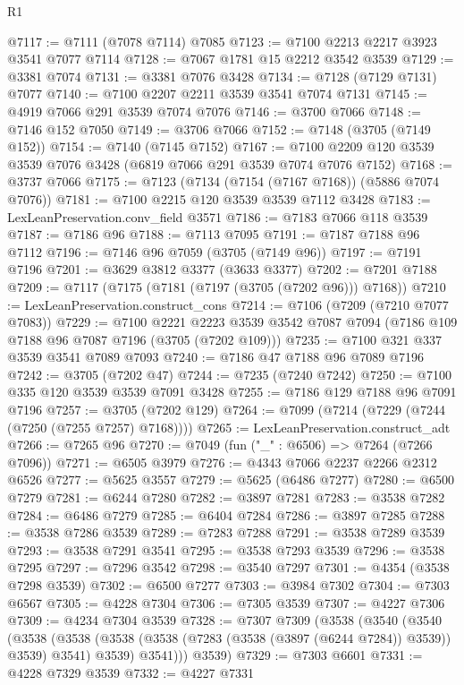 \begin{lexlean}{R1}
\begin{coremodule}
@7117 := @7111 (@7078 @7114) @7085
@7123 := @7100 @2213 @2217 @3923 @3541 @7077 @7114
@7128 := @7067 @1781 @15 @2212 @3542 @3539
@7129 := @3381 @7074
@7131 := @3381 @7076 @3428
@7134 := @7128 (@7129 @7131) @7077
@7140 := @7100 @2207 @2211 @3539 @3541 @7074 @7131
@7145 := @4919 @7066 @291 @3539 @7074 @7076
@7146 := @3700 @7066
@7148 := @7146 @152 @7050
@7149 := @3706 @7066
@7152 := @7148 (@3705 (@7149 @152))
@7154 := @7140 (@7145 @7152)
@7167 := @7100 @2209 @120 @3539 @3539 @7076 @3428 (@6819 @7066 @291 @3539 @7074 @7076 @7152)
@7168 := @3737 @7066
@7175 := @7123 (@7134 (@7154 (@7167 @7168)) (@5886 @7074 @7076))
@7181 := @7100 @2215 @120 @3539 @3539 @7112 @3428
@7183 := LexLeanPreservation.conv_field @3571
@7186 := @7183 @7066 @118 @3539
@7187 := @7186 @96
@7188 := @7113 @7095
@7191 := @7187 @7188 @96 @7112
@7196 := @7146 @96 @7059 (@3705 (@7149 @96))
@7197 := @7191 @7196
@7201 := @3629 @3812 @3377 (@3633 @3377)
@7202 := @7201 @7188
@7209 := @7117 (@7175 (@7181 (@7197 (@3705 (@7202 @96))) @7168))
@7210 := LexLeanPreservation.construct_cons
@7214 := @7106 (@7209 (@7210 @7077 @7083))
@7229 := @7100
    @2221
    @2223
    @3539
    @3542
    @7087
    @7094
    (@7186 @109 @7188 @96 @7087 @7196 (@3705 (@7202 @109)))
@7235 := @7100 @321 @337 @3539 @3541 @7089 @7093
@7240 := @7186 @47 @7188 @96 @7089 @7196
@7242 := @3705 (@7202 @47)
@7244 := @7235 (@7240 @7242)
@7250 := @7100 @335 @120 @3539 @3539 @7091 @3428
@7255 := @7186 @129 @7188 @96 @7091 @7196
@7257 := @3705 (@7202 @129)
@7264 := @7099 (@7214 (@7229 (@7244 (@7250 (@7255 @7257) @7168))))
@7265 := LexLeanPreservation.construct_adt
@7266 := @7265 @96
@7270 := @7049 (fun ("_" : @6506) => @7264 (@7266 @7096))
@7271 := @6505 @3979
@7276 := @4343 @7066 @2237 @2266 @2312 @6526
@7277 := @5625 @3557
@7279 := @5625 (@6486 @7277)
@7280 := @6500 @7279
@7281 := @6244 @7280
@7282 := @3897 @7281
@7283 := @3538 @7282
@7284 := @6486 @7279
@7285 := @6404 @7284
@7286 := @3897 @7285
@7288 := @3538 @7286 @3539
@7289 := @7283 @7288
@7291 := @3538 @7289 @3539
@7293 := @3538 @7291 @3541
@7295 := @3538 @7293 @3539
@7296 := @3538 @7295
@7297 := @7296 @3542
@7298 := @3540 @7297
@7301 := @4354 (@3538 @7298 @3539)
@7302 := @6500 @7277
@7303 := @3984 @7302
@7304 := @7303 @6567
@7305 := @4228 @7304
@7306 := @7305 @3539
@7307 := @4227 @7306
@7309 := @4234 @7304 @3539
@7328 := @7307
    @7309
    (@3538
      (@3540
        (@3540
          (@3538
            (@3538 (@3538 (@3538 (@7283 (@3538 (@3897 (@6244 @7284)) @3539)) @3539) @3541) @3539)
            @3541)))
      @3539)
@7329 := @7303 @6601
@7331 := @4228 @7329 @3539
@7332 := @4227 @7331

\end{coremodule}
\end{lexlean}
